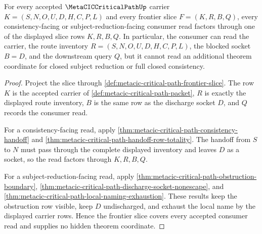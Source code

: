\begin{theorem}
\label{thm:metacic-critical-path-frontier-coverage}
For every accepted $\MetaCICCriticalPathUp$ carrier $K=(S,N,O,U,D,H,C,P,L)$ and every frontier slice $F=(K,R,B,Q)$, every consistency-facing or subject-reduction-facing consumer read factors through one of the displayed slice rows $K,R,B,Q$. In particular, the consumer can read the carrier, the route inventory $R=(S,N,O,U,D,H,C,P,L)$, the blocked socket $B=D$, and the downstream query $Q$, but it cannot read an additional theorem coordinate for closed subject reduction or full closed consistency.
\end{theorem}
\begin{proof}
Project the slice through \autoref{def:metacic-critical-path-frontier-slice}. The row $K$ is the accepted carrier of \autoref{def:metacic-critical-path-packet}, $R$ is exactly the displayed route inventory, $B$ is the same row as the discharge socket $D$, and $Q$ records the consumer read.

For a consistency-facing read, apply \autoref{thm:metacic-critical-path-consistency-handoff} and \autoref{thm:metacic-critical-path-handoff-row-totality}. The handoff from $S$ to $N$ must pass through the complete displayed inventory and leaves $D$ as a socket, so the read factors through $K,R,B,Q$.

For a subject-reduction-facing read, apply \autoref{thm:metacic-critical-path-obstruction-boundary}, \autoref{thm:metacic-critical-path-discharge-socket-nonescape}, and \autoref{thm:metacic-critical-path-local-naming-exhaustion}. These results keep the obstruction row visible, keep $D$ undischarged, and exhaust the local name by the displayed carrier rows. Hence the frontier slice covers every accepted consumer read and supplies no hidden theorem coordinate.
\end{proof}


